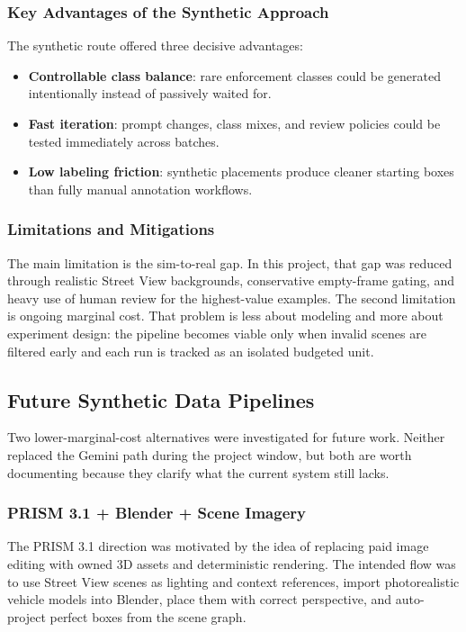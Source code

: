 \documentclass[12pt,a4paper]{article}
\begin{document}
\subsubsection{Key Advantages of the Synthetic Approach}

The synthetic route offered three decisive advantages:

\begin{itemize}
	\item \textbf{Controllable class balance}: rare enforcement classes could be generated intentionally instead of passively waited for.
	\item \textbf{Fast iteration}: prompt changes, class mixes, and review policies could be tested immediately across batches.
	\item \textbf{Low labeling friction}: synthetic placements produce cleaner starting boxes than fully manual annotation workflows.
\end{itemize}

\subsubsection{Limitations and Mitigations}

The main limitation is the sim-to-real gap. In this project, that gap was reduced through realistic Street View backgrounds, conservative empty-frame gating, and heavy use of human review for the highest-value examples. The second limitation is ongoing marginal cost. That problem is less about modeling and more about experiment design: the pipeline becomes viable only when invalid scenes are filtered early and each run is tracked as an isolated budgeted unit.

\subsection{Future Synthetic Data Pipelines}

Two lower-marginal-cost alternatives were investigated for future work. Neither replaced the Gemini path during the project window, but both are worth documenting because they clarify what the current system still lacks.

\subsubsection{PRISM 3.1 + Blender + Scene Imagery}

The PRISM 3.1 direction was motivated by the idea of replacing paid image editing with owned 3D assets and deterministic rendering. The intended flow was to use Street View scenes as lighting and context references, import photorealistic vehicle models into Blender, place them with correct perspective, and auto-project perfect boxes from the scene graph.
\end{document}
